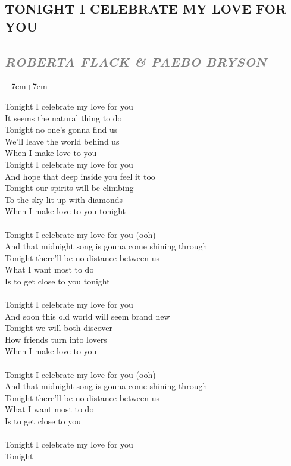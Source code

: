 \documentclass[100pt,a4paper]{report}
\newenvironment{song1}[3]
	{
			\begin{spacing}{0.6}
				\section*{\LARGE\centering \MakeUppercase{\textbf{{#1}}}}
				\subsection*{\Large\centering \textit{\textcolor{gray}{\MakeUppercase{{#2}}}}}
			\end{spacing}
			\vspace{0.8cm}
			\begin{adjustwidth}{+7em}{+7em}
			\Large
			
	}
	{
		\end{adjustwidth}
		\newpage
    }
\begin{document}
\begin{song1}{Tonight i celebrate my love for you}{roberta flack \& Paebo Bryson}
\noindent
Tonight I celebrate my love for you\\
It seems the natural thing to do\\
Tonight no one's gonna find us\\
We'll leave the world behind us\\
When I make love to you\\
Tonight I celebrate my love for you\\
And hope that deep inside you feel it too\\
Tonight our spirits will be climbing\\
To the sky lit up with diamonds\\
When I make love to you tonight\\
\\
Tonight I celebrate my love for you (ooh)\\
And that midnight song is gonna come shining through\\
Tonight there'll be no distance between us\\
What I want most to do\\
Is to get close to you tonight\\
\\
Tonight I celebrate my love for you\\
And soon this old world will seem brand new\\
Tonight we will both discover\\
How friends turn into lovers\\
When I make love to you\\
\\
Tonight I celebrate my love for you (ooh)\\
And that midnight song is gonna come shining through\\
Tonight there'll be no distance between us\\
What I want most to do\\
Is to get close to you\\
\\
Tonight I celebrate my love for you \\
Tonight
\end{song1}
\end{document}
